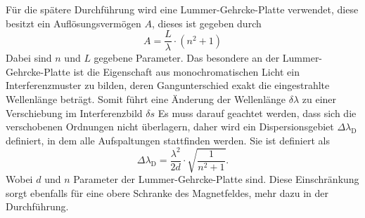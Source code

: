 Für die spätere Durchführung wird eine Lummer-Gehrcke-Platte verwendet, diese besitzt ein Auflösungsvermögen $A$, dieses ist gegeben durch 
\begin{equation}
    A = \frac{L}{\lambda} \cdot \left( n^2 + 1 \right)
   \label{eq:aufloesung}
\end{equation}
Dabei sind $n$ und $L$ gegebene Parameter.
Das besondere an der Lummer-Gehrcke-Platte ist die Eigenschaft aus monochromatischen Licht ein Interferenzmuster zu bilden, deren Gangunterschied exakt die eingestrahlte Wellenlänge beträgt.
Somit führt eine Änderung der Wellenlänge $\delta \lambda$ zu einer Verschiebung im Interferenzbild  $\delta s$
Es muss darauf geachtet werden, dass sich die verschobenen Ordnungen nicht überlagern, daher wird ein Dispersionsgebiet $\Delta \lambda _\text{D}$ definiert, in dem alle Aufspaltungen stattfinden werden. 
Sie ist definiert als 
\begin{equation}
    \Delta \lambda _\text{D} = \frac{\lambda ^2}{2 d} \cdot \sqrt{ \frac{1}{n^2 + 1}    }.
   \label{eq:dispers}
\end{equation}
Wobei $d$ und $n$ Parameter der Lummer-Gehrcke-Platte sind. 
Diese Einschränkung sorgt ebenfalls für eine obere Schranke des Magnetfeldes, mehr dazu in der Durchführung. 